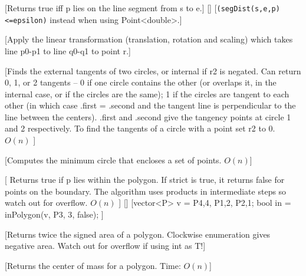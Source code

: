 [Returns true iff p lies on the line segment from s to e.]
[]
[\texttt{(segDist(s,e,p)<=epsilon)} instead when using Point<double>.]

[Apply the linear transformation (translation, rotation and scaling) which takes line p0-p1 to line q0-q1 to point r.]


[Finds the external tangents of two circles, or internal if r2 is negated.
 Can return 0, 1, or 2 tangents -- 0 if one circle contains the other (or overlaps it, in the internal case, or if the circles are the same);
 1 if the circles are tangent to each other (in which case .first = .second and the tangent line is perpendicular to the line between the centers).
 .first and .second give the tangency points at circle 1 and 2 respectively.
 To find the tangents of a circle with a point set r2 to 0. $O(n)$
 ]

 [Computes the minimum circle that encloses a set of points. $O(n)$]

 [
 Returns true if p lies within the polygon. If strict is true, it returns false for 
 points on the boundary. The algorithm uses products in intermediate steps so watch out for overflow. $O(n)$
 ]
 []
 [vector<P> v = {P{4,4}, P{1,2}, P{2,1}};
 bool in = inPolygon(v, P{3, 3}, false);
 ]

[Returns twice the signed area of a polygon. Clockwise enumeration gives negative area. 
Watch out for overflow if using int as T!]

[Returns the center of mass for a polygon. Time: $O(n)$]


